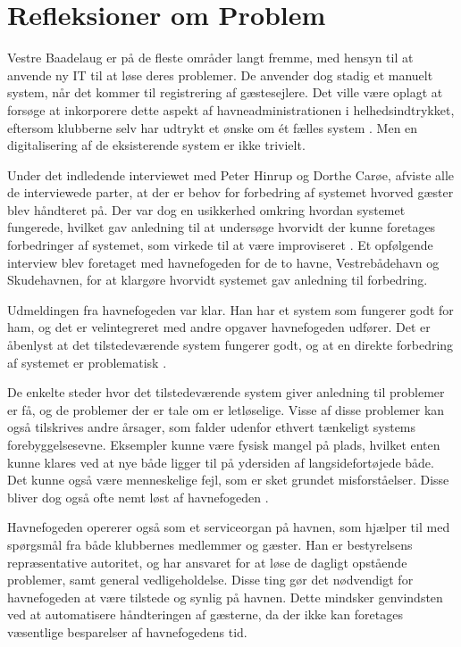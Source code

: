 \chapter{Refleksioner om Problem}

Vestre Baadelaug er på de fleste områder langt fremme, med hensyn til at anvende ny IT til at løse deres problemer. De anvender dog stadig et manuelt system, når det kommer til registrering af gæstesejlere. Det ville være oplagt at forsøge at inkorporere dette aspekt af havneadministrationen i helhedsindtrykket, eftersom klubberne selv har udtrykt et ønske om ét fælles system \cite{int_vb_sl}. Men en digitalisering af de eksisterende system er ikke trivielt.

Under det indledende interviewet med Peter Hinrup og Dorthe Carøe, afviste alle de interviewede parter, at der er behov for forbedring af systemet hvorved gæster blev håndteret på. Der var dog en usikkerhed omkring hvordan systemet fungerede, hvilket gav anledning til at undersøge hvorvidt der kunne foretages forbedringer af systemet, som virkede til at være improviseret \cite{int_vb_sl}. Et opfølgende interview blev foretaget med havnefogeden for de to havne, Vestrebådehavn og Skudehavnen, for at klargøre hvorvidt systemet gav anledning til forbedring.

Udmeldingen fra havnefogeden var klar. Han har et system som fungerer godt for ham, og det er velintegreret med andre opgaver havnefogeden udfører. Det er åbenlyst at det tilstedeværende system fungerer godt, og at en direkte forbedring af systemet er problematisk \cite{ny interview}. 


De enkelte steder hvor det tilstedeværende system giver anledning til problemer er få, og de problemer der er tale om er letløselige. Visse af disse problemer kan også tilskrives andre årsager, som falder udenfor ethvert tænkeligt systems forebyggelsesevne. Eksempler kunne være fysisk mangel på plads, hvilket enten kunne klares ved at nye både ligger til på ydersiden af langsidefortøjede både. Det kunne også være menneskelige fejl, som er sket grundet misforståelser. Disse bliver dog også ofte nemt løst af havnefogeden \cite{ny interview}.

Havnefogeden opererer også som et serviceorgan på havnen, som hjælper til med spørgsmål fra både klubbernes medlemmer og gæster. Han er bestyrelsens repræsentative autoritet, og har ansvaret for at løse de dagligt opstående problemer, samt general vedligeholdelse. Disse ting gør det nødvendigt for havnefogeden at være tilstede og synlig på havnen. Dette mindsker genvindsten ved at automatisere håndteringen af gæsterne, da der ikke kan foretages væsentlige besparelser af havnefogedens tid.



